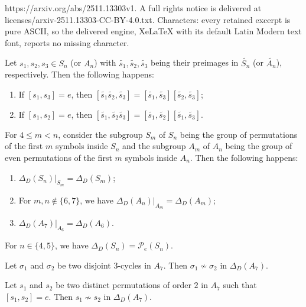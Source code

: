 \documentclass[10pt,a4paper]{amsart}
\begin{document}
https://arxiv.org/abs/2511.13303v1. A full rights notice is delivered at licenses/arxiv-2511.13303-CC-BY-4.0.txt. Characters: every retained excerpt is pure ASCII, so the delivered engine, XeLaTeX with its default Latin Modern text font, reports no missing character.
\begin{lemma}\label{disjoint_commutators}
Let $s_1,s_2,s_3\in S_n$ (or $A_n$) with $\tilde{s_1},\tilde{s_2},\tilde{s_3}$ being their preimages in $\tilde{S_n}$ (or $\tilde{A_n}$), respectively. Then the following happens:
\begin{enumerate}[\rm (i)]
\item If $[s_1,s_3]=e$, then $[\tilde{s_1}\tilde{s_2},\tilde{s_3}]=[\tilde{s_1},\tilde{s_3}][\tilde{s_2},\tilde{s_3}]$;
\item If $[s_1,s_2]=e$, then $[\tilde{s_1},\tilde{s_2}\tilde{s_3}]=[\tilde{s_1},\tilde{s_2}][\tilde{s_1},\tilde{s_3}]$.
\end{enumerate}    
\end{lemma}

\begin{proposition}\label{induced_S_n and A_n}
 For $4\leq m< n$, consider the subgroup $S_m$ of $S_n$ being the group of permutations of the first $m$ symbols inside $S_n$ and the subgroup $A_m$ of $A_n$ being the group of even permutations of the first $m$ symbols inside $A_n$. Then the following happens:
 \begin{enumerate}[\rm (i)]
     \item $\Delta_D(S_n)\vert_{S_m}=\Delta_D(S_m)$;
     \item For $m,n\notin\{6,7\}$, we have $\Delta_D(A_n)\vert_{A_m}=\Delta_D(A_m)$;
     \item $\Delta_D(A_7)\vert_{A_6}=\Delta_D(A_6)$.
 \end{enumerate}    
\end{proposition}

\begin{proposition}\label{deep commuting of S_4,5}
For $n\in\{4,5\}$, we have $\Delta_D(S_n)=\mathcal{P}_e(S_n)$.
\end{proposition}

\begin{lemma}\label{3-cycle A_7}
Let $\sigma_1$ and $\sigma_2$ be two disjoint $3$-cycles in $A_7$. Then $\sigma_1\nsim\sigma_2$ in $\Delta_D(A_7)$.    
\end{lemma}

\begin{lemma}\label{2-cycle A_7}
Let $s_1$ and $s_2$ be two distinct permutations of order $2$ in $A_7$ such that $[s_1,s_2]=e$. Then $s_1\nsim s_2$ in $\Delta_D(A_7)$.    
\end{lemma}
\end{document}
